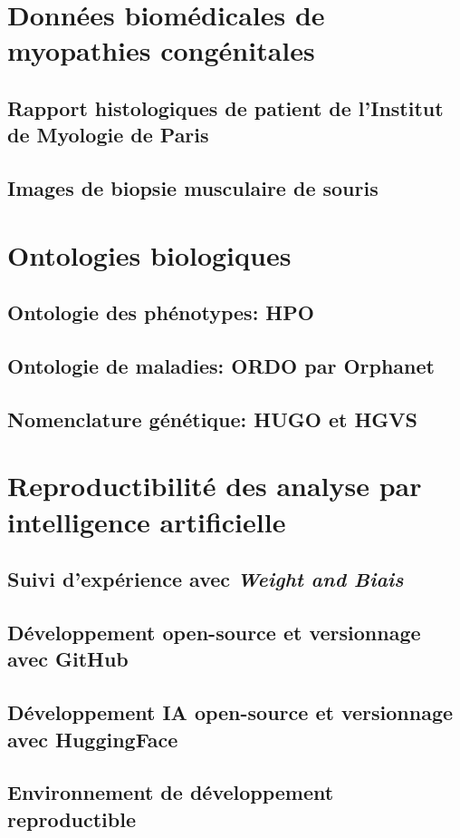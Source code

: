\section{Données biomédicales de myopathies congénitales}
\subsection{Rapport histologiques de patient de l'Institut de Myologie de Paris}
\subsection{Images de biopsie musculaire de souris}
\section{Ontologies biologiques}
\subsection{Ontologie des phénotypes: HPO}
\subsection{Ontologie de maladies: ORDO par Orphanet}
\subsection{Nomenclature génétique: HUGO et HGVS}
\section{Reproductibilité des analyse par intelligence artificielle}
\subsection{Suivi d'expérience avec \textit{Weight and Biais}}
\subsection{Développement open-source et versionnage avec GitHub}
\subsection{Développement IA open-source et versionnage avec HuggingFace}
\subsection{Environnement de développement reproductible}
